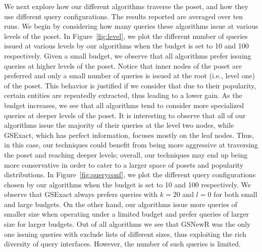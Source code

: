 We next explore how our different algorithms traverse the poset, and how they use different query configurations. The results reported are averaged over ten runs. We begin by considering how many queries these algorithms issue at various levels of the poset. In Figure~\ref{fig:level}, we plot the different number of queries issued at various levels by our algorithms when the budget is set to 10 and 100 respectively. Given a small budget, we observe that all algorithms prefer issuing queries at higher levels of the poset. Notice that inner nodes of the poset are preferred and only a small number of queries is issued at the root (i.e., level one) of the poset. This behavior is justified if we consider that due to their popularity, certain entities are repeatedly extracted, thus leading to a lower gain. As the budget increases, we see that all algorithms tend to consider more specialized queries at deeper levels of the poset. It is interesting to observe that all of our algorithms issue the majority of their queries at the level two nodes, while GSExact, which has perfect information, focuses mostly on the leaf nodes. Thus, in this case, our techniques could benefit from being more aggressive at traversing the poset and reaching deeper levels; overall, our techniques may end up being more conservative in order to cater to a larger space of posets and popularity distributions. In Figure~\ref{fig:queryconf}, we plot the different query configurations chosen by our algorithms when the budget is set to 10 and 100 respectively. We observe that GSExact always prefers queries with $k = 20$ and $l = 0$ for both small and large budgets. On the other hand, our algorithms issue more queries of smaller size when operating under a limited budget and prefer queries of larger size for larger budgets. Out of all algorithms we see that GSNewR was the only one issuing queries with exclude lists of different sizes, thus exploiting the rich diversity of query interfaces. However, the number of such queries is limited. 


